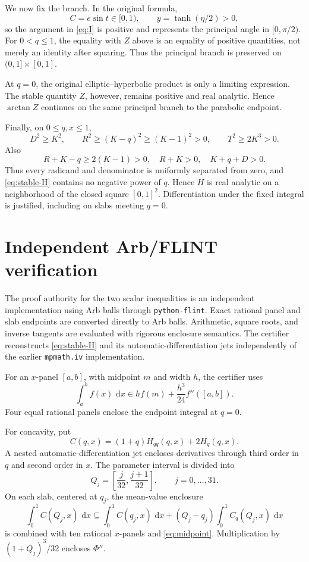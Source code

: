 \documentclass[11pt]{article}
\numberwithin{equation}{section}
\theoremstyle{remark}
\newcommand{\dd}{\,\mathrm d}
\begin{document}
We now fix the branch.  In the original formula,
\[
  C=e\sin t\in[0,1),
  \qquad y=\tanh(\eta/2)>0,
\]
so the argument in \eqref{eq:I} is positive and represents the principal angle in \([0,\pi/2)\).  For \(0<q\le1\), the equality with \(Z\) above is an equality of positive quantities, not merely an identity after squaring.  Thus the principal branch is preserved on \((0,1]\times[0,1]\).

At \(q=0\), the original elliptic--hyperbolic product is only a limiting expression.  The stable quantity \(Z\), however, remains positive and real analytic.  Hence \(\arctan Z\) continues on the same principal branch to the parabolic endpoint.

Finally, on \(0\le q,x\le1\),
\[
  D^2\ge K^2,
  \qquad
  R^2\ge(K-q)^2\ge(K-1)^2>0,
  \qquad
  T^2\ge2K^3>0.
\]
Also
\[
  R+K-q\ge2(K-1)>0,
  \quad R+K>0,
  \quad K+q+D>0.
\]
Thus every radicand and denominator is uniformly separated from zero, and \eqref{eq:stable-H} contains no negative power of \(q\).  Hence \(H\) is real analytic on a neighborhood of the closed square \([0,1]^2\).  Differentiation under the fixed integral is justified, including on slabs meeting \(q=0\).

\section{Independent Arb/FLINT verification}
\label{app:arb}

The proof authority for the two scalar inequalities is an independent implementation using Arb balls through \texttt{python-flint}.  Exact rational panel and slab endpoints are converted directly to Arb balls.  Arithmetic, square roots, and inverse tangents are evaluated with rigorous enclosure semantics.  The certifier reconstructs \eqref{eq:stable-H} and its automatic-differentiation jets independently of the earlier \texttt{mpmath.iv} implementation.

For an \(x\)-panel \([a,b]\), with midpoint \(m\) and width \(h\), the certifier uses
\begin{equation}
  \int_a^bf(x)\,\dd x
  \in h f(m)+\frac{h^3}{24}f''([a,b]).
  \label{eq:midpoint}
\end{equation}
Four equal rational panels enclose the endpoint integral at \(q=0\).

For concavity, put
\[
  C(q,x)=(1+q)H_{qq}(q,x)+2H_q(q,x).
\]
A nested automatic-differentiation jet encloses derivatives through third order in \(q\) and second order in \(x\).  The parameter interval is divided into
\[
  Q_j=\left[\frac j{32},\frac{j+1}{32}\right],
  \qquad j=0,\ldots,31.
\]
On each slab, centered at \(q_j\), the mean-value enclosure
\[
  \int_0^1C(Q_j,x)\,\dd x
  \subseteq
  \int_0^1C(q_j,x)\,\dd x
  +(Q_j-q_j)\int_0^1C_q(Q_j,x)\,\dd x
\]
is combined with ten rational \(x\)-panels and \eqref{eq:midpoint}.  Multiplication by \((1+Q_j)^3/32\) encloses \(\Phi''\).
\end{document}
